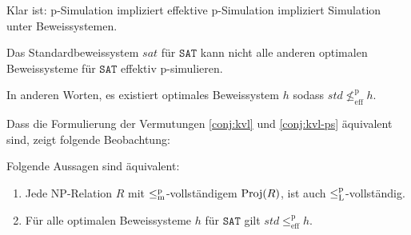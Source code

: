 Klar ist: p-Simulation impliziert effektive p-Simulation impliziert Simulation unter Beweissystemen.

\begin{conjecture}\label{conj:kvl-ps}
    Das Standardbeweissystem $\mathit{sat}$ für $\mathtt{SAT}$ kann nicht alle anderen optimalen Beweissysteme für $\mathtt{SAT}$ effektiv p-simulieren.

    In anderen Worten, es existiert optimales Beweissystem $h$ sodass $\mathit{std}\not\leq^\mathrm p_\mathrm{eff} h$.
\end{conjecture}
Dass die Formulierung der Vermutungen \ref{conj:kvl} und \ref{conj:kvl-ps} äquivalent sind, zeigt folgende Beobachtung:
\begin{observation}
    Folgende Aussagen sind äquivalent:
    \begin{enumerate}
        \item Jede NP-Relation $R$ mit  $\leq_\mathrm{m}^\mathrm{p}$-vollständigem $\operatorname{Proj}(R)$, ist auch $\leq_\mathrm{L}^\mathrm{p}$-vollständig.
        \item Für alle optimalen Beweissysteme $h$ für $\mathtt{SAT}$ gilt $\mathit{std}\leq^\mathrm p_\mathrm{eff} h$.
    \end{enumerate}
\end{observation}
